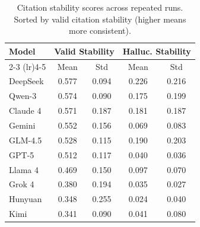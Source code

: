 \begin{table}[t]
  \centering
  \begin{threeparttable}
    \caption{Citation stability scores across repeated runs. Sorted by valid citation stability (higher means more consistent).}
    \label{tab:citation_stability}
    \small
\begin{tabular}{lcccc}
\toprule
\textbf{Model} & \multicolumn{2}{c}{\cellcolor{green!14}\textbf{Valid Stability}} & \multicolumn{2}{c}{\cellcolor{red!14}\textbf{Halluc. Stability}} \\
\cmidrule(lr){2-3} \cmidrule(lr){4-5}
 & \cellcolor{green!12}Mean & \cellcolor{green!12}Std & \cellcolor{red!12}Mean & \cellcolor{red!12}Std \\
\midrule
\cellcolor{tableRowLight}DeepSeek & \cellcolor{green!24}0.577 & \cellcolor{green!24}0.094 & \cellcolor{red!18}0.226 & \cellcolor{red!18}0.216 \\
\cellcolor{tableRowWhite}Qwen-3 & \cellcolor{green!24}0.574 & \cellcolor{green!24}0.090 & \cellcolor{red!16}0.175 & \cellcolor{red!16}0.199 \\
\cellcolor{tableRowLight}Claude 4 & \cellcolor{green!24}0.571 & \cellcolor{green!24}0.187 & \cellcolor{red!16}0.181 & \cellcolor{red!16}0.187 \\
\cellcolor{tableRowWhite}Gemini & \cellcolor{green!22}0.552 & \cellcolor{green!22}0.156 & \cellcolor{red!12}0.069 & \cellcolor{red!12}0.083 \\
\cellcolor{tableRowLight}GLM-4.5 & \cellcolor{green!20}0.528 & \cellcolor{green!20}0.115 & \cellcolor{red!16}0.190 & \cellcolor{red!16}0.203 \\
\cellcolor{tableRowWhite}GPT-5 & \cellcolor{green!20}0.512 & \cellcolor{green!20}0.117 & \cellcolor{red!10}0.040 & \cellcolor{red!10}0.036 \\
\cellcolor{tableRowLight}Llama 4 & \cellcolor{green!18}0.469 & \cellcolor{green!18}0.150 & \cellcolor{red!12}0.097 & \cellcolor{red!12}0.070 \\
\cellcolor{tableRowWhite}Grok 4 & \cellcolor{green!14}0.380 & \cellcolor{green!14}0.194 & \cellcolor{red!10}0.035 & \cellcolor{red!10}0.027 \\
\cellcolor{tableRowLight}Hunyuan & \cellcolor{green!14}0.348 & \cellcolor{green!14}0.255 & \cellcolor{red!8}0.024 & \cellcolor{red!8}0.040 \\
\cellcolor{tableRowWhite}Kimi & \cellcolor{green!14}0.341 & \cellcolor{green!14}0.090 & \cellcolor{red!10}0.041 & \cellcolor{red!10}0.080 \\

\end{tabular}
\end{threeparttable}
\end{table}

